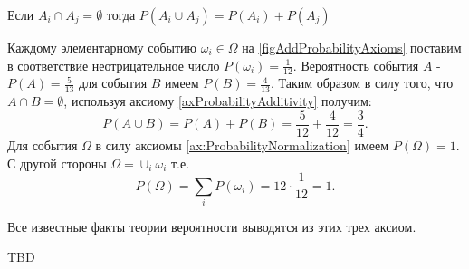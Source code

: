 \begin{axiom}[Аддитивность]
\label{axProbabilityAdditivity}
Если $A_i \cap A_j = \emptyset$ тогда 
$P\left(A_i \cup A_j\right) = P\left(A_i\right) + P\left(A_j\right)$
\end{axiom}

\begin{example}

Каждому элементарному событию $\omega_i \in \Omega$
на \autoref{figAddProbabilityAxioms} поставим в соответствие
неотрицательное число 
$P\left(\omega_i\right) = \frac{1}{12}$. Вероятность события $A$ - 
$P\left(A\right) = \frac{5}{13}$ для события $B$ имеем
$P\left(B\right) = \frac{4}{13}$. Таким образом в силу того, что 
$A \cap B = \emptyset$, используя аксиому
\ref{axProbabilityAdditivity} получим:
\[
P\left(A\cup B\right) = 
P\left(A\right) + P\left(B\right) = 
\frac{5}{12} + \frac{4}{12} = \frac{3}{4}.
\]
Для события $\Omega$ в силу аксиомы \ref{ax:ProbabilityNormalization}
имеем $P\left(\Omega\right) = 1$. С другой стороны 
$\Omega = \cup_i \omega_i$ т.е. 
\[
P\left(\Omega\right) = \sum_i P\left(\omega_i\right) =
12\cdot\frac{1}{12} = 1.
\]
\end{example}


Все известные факты теории вероятности выводятся из этих трех аксиом.  



TBD
